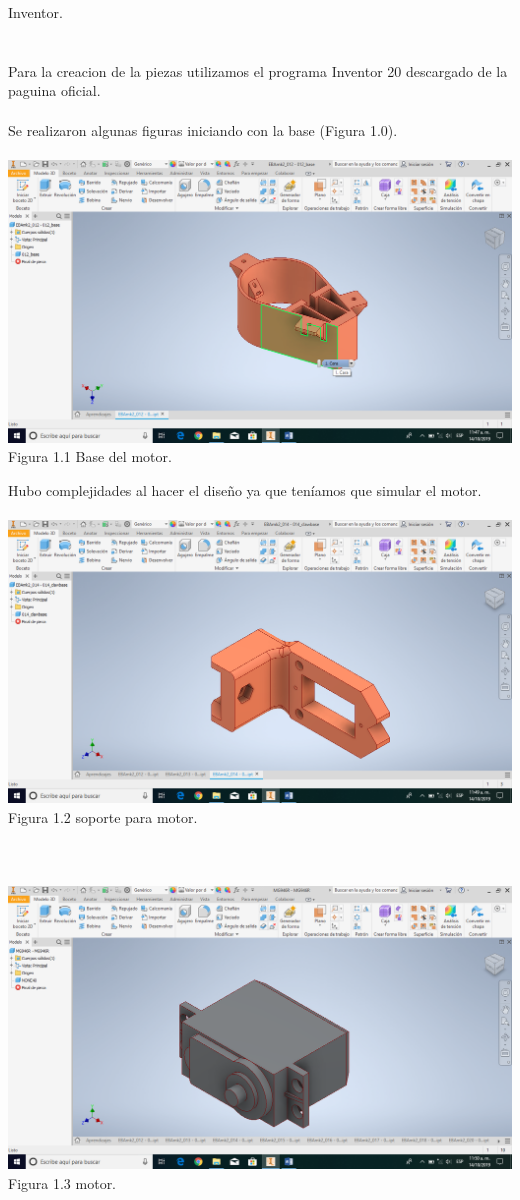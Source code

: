 \documentclass[12pt,a4paper]{article}
\begin{document}
Inventor.
\\\\\\
Para la creacion de la piezas utilizamos el programa Inventor 20 descargado de la paguina oficial.
\\\\
Se realizaron algunas figuras iniciando con la base (Figura 1.0).
\\\\
\includegraphics[scale=0.5]{base 1.png} 
\\
Figura 1.1 Base del motor.
\newpage

Hubo complejidades al hacer el diseño ya que teníamos que simular el motor. 
\\\\
\includegraphics[scale=0.5]{base2.png} 
\\
Figura 1.2 soporte para motor.
\\\\\\\\
\includegraphics[scale=0.5]{base3.png} 
\\
Figura 1.3 motor.
\end{document}
